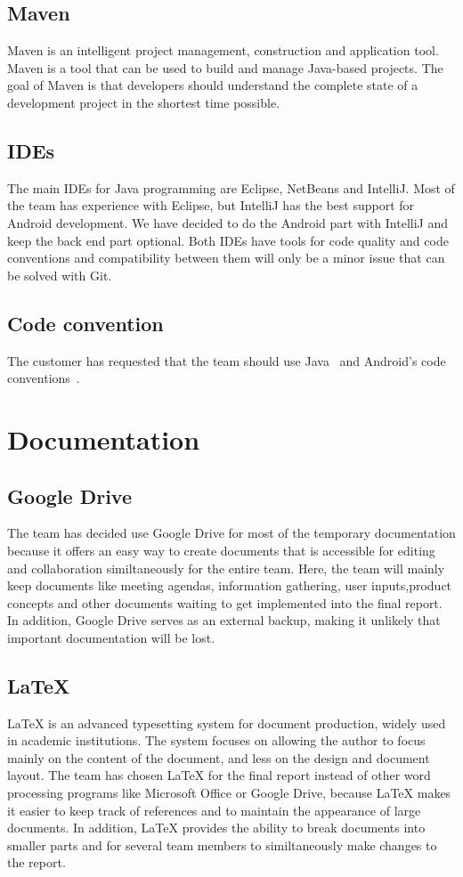 \subsection{Maven}
Maven is an intelligent project management, construction and application tool. Maven is a tool that can be used to build and manage Java-based projects. The goal of Maven is that developers should understand the complete state of a development project in the shortest time possible.

\subsection{IDEs}
The main IDEs for Java programming are Eclipse, NetBeans and IntelliJ. Most of the team has experience with Eclipse, but IntelliJ has the best support for Android development.
We have decided to do the Android part with IntelliJ and keep the back end part optional. Both IDEs have tools for code quality and code conventions and compatibility between them will only be a minor issue that can be solved with Git.

\subsection{Code convention}
The customer has requested that the team should use Java~\cite{javaconv} and Android's code conventions~\cite{androidconv}.

\section{Documentation}

\subsection{Google Drive}
The team has decided use Google Drive for most of the temporary documentation because it offers an easy way to create 
documents that is accessible for editing and collaboration similtaneously for the entire team. Here, the team will mainly 
keep documents like meeting agendas, information gathering, user inputs,product concepts and other documents 
waiting to get implemented into the final report. 
In addition, Google Drive serves as an external backup, making it unlikely that important documentation will be lost. 


\subsection{\LaTeX}
LaTeX is an advanced typesetting system for document production, widely used in
academic institutions. The system focuses on allowing the author to focus mainly on the content of the document, 
and less on the design and document layout.
The team has chosen LaTeX for the final report instead of other word processing programs like Microsoft Office or 
Google Drive, because LaTeX makes it easier to keep track of references and to maintain the appearance of large
documents. In addition, LaTeX provides the ability to break documents into smaller parts and for several team 
members to similtaneously make changes to the report.


